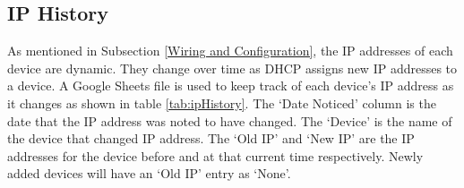 \begin{table}[H]
    \centering
    \caption{Device inventory excerpt. Password column not shown.}
    \label{tab:deviceInventory}
\end{table}

\subsection{IP History}
\label{IP History}
As mentioned in Subsection \ref{Wiring and Configuration}, the IP addresses of each device are dynamic. They change over time as DHCP assigns new IP addresses to a device. A Google Sheets file is used to keep track of each device's IP address as it changes as shown in table \ref{tab:ipHistory}. The `Date Noticed' column is the date that the IP address was noted to have changed. The `Device' is the name of the device that changed IP address. The `Old IP' and `New IP' are the IP addresses for the device before and at that current time respectively. Newly added devices will have an `Old IP' entry as `None'.

